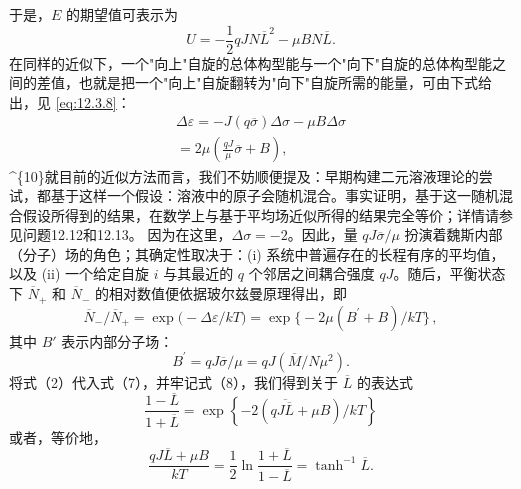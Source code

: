 于是，\(E\) 的期望值可表示为
\begin{equation}\tag{12.5.5}\label{eq:12.5.5}
U = - \frac { 1 } { 2 } q J N \overline { { { L } } } ^{2} - \mu B N \overline { { { L } } } .
\end{equation}
在同样的近似下，一个"向上"自旋的总体构型能与一个"向下"自旋的总体构型能之间的差值，也就是把一个"向上"自旋翻转为"向下"自旋所需的能量，可由下式给出，见 \autoref{eq:12.3.8}：
\begin{equation}\tag{12.5.6}\label{eq:12.5.6}
\begin{array}{r} { \Delta \varepsilon = - J ( q \overline { { \sigma } } ) \Delta \sigma - \mu B \Delta \sigma } \\{ = 2 \mu \left( \frac { q J } { \mu } \overline { { \sigma } } + B \right) , } \end{array}
\end{equation}
\^{}\{10\}就目前的近似方法而言，我们不妨顺便提及：早期构建二元溶液理论的尝试，都基于这样一个假设：溶液中的原子会随机混合。事实证明，基于这一随机混合假设所得到的结果，在数学上与基于平均场近似所得的结果完全等价；详情请参见问题12.12和12.13。
因为在这里，\(\Delta\sigma = -2\)。因此，量 \(qJ\overline{\sigma}/\mu\) 扮演着魏斯内部（分子）场的角色；其确定性取决于：(i) 系统中普遍存在的长程有序的平均值，以及 (ii) 一个给定自旋 \(i\) 与其最近的 \(q\) 个邻居之间耦合强度 \(qJ\)。随后，平衡状态下 \(\overline{N}_{+}\) 和 \(\overline{N}_{-}\) 的相对数值便依据玻尔兹曼原理得出，即
\begin{equation}\tag{12.5.7}\label{eq:12.5.7}
\overline { { N } } _ { - } / \overline { { N } } _ { + } = \exp \bigl ( - \Delta \varepsilon / k T \bigr ) = \exp \bigl \{ - 2 \mu ( B ^{\prime} + B ) / k T \bigr \} \, ,
\end{equation}
其中 \(B'\) 表示内部分子场：
\begin{equation}\tag{12.5.8}\label{eq:12.5.8}
B ^{\prime} = q J \overline { { { \sigma } } } / \mu = q J \left( \overline { { { M } } } / N \mu ^{2} \right) .
\end{equation}
将式（2）代入式（7），并牢记式（8），我们得到关于 \(\overline{L}\) 的表达式
\begin{equation}\tag{12.5.9}\label{eq:12.5.9}
\frac { 1 - \overline { { L } } } { 1 + \overline { { L } } } = \exp \left\{ - 2 ( q \overline { { J \overline { { L } } } } + \mu B ) / k T \right\}
\end{equation}
或者，等价地，
\begin{equation}\tag{12.5.10}\label{eq:12.5.10}
\frac { q J \overline { { { L } } } + \mu B } { k T } = \frac { 1 } { 2 } \ln \frac { 1 + \overline { { { L } } } } { 1 - \overline { { { L } } } } = \operatorname { t a n h } ^{- 1} \overline { { { L } } } .
\end{equation}
